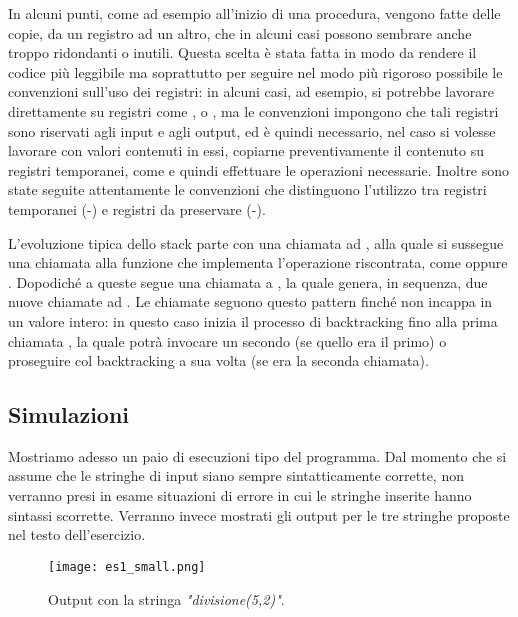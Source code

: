 		In alcuni punti, come ad esempio all'inizio di una procedura, vengono fatte delle copie, da un registro ad un altro, che in alcuni casi possono sembrare anche troppo ridondanti o inutili. Questa scelta è stata fatta in modo da rendere il codice più leggibile ma soprattutto per seguire nel modo più rigoroso possibile le convenzioni sull'uso dei registri: in alcuni casi, ad esempio, si potrebbe lavorare direttamente su registri come ,  o , ma le convenzioni impongono che tali registri sono riservati agli input e agli output, ed è quindi necessario, nel caso si volesse lavorare con valori contenuti in essi, copiarne preventivamente il contenuto su registri temporanei, come  e quindi effettuare le operazioni necessarie. Inoltre sono state seguite attentamente le convenzioni che distinguono l'utilizzo tra registri temporanei (-) e registri da preservare (-).
		
		L'evoluzione tipica dello stack parte con una chiamata ad , alla quale si sussegue una chiamata alla funzione che implementa l'operazione riscontrata, come  oppure . Dopodiché a queste segue una chiamata a , la quale genera, in sequenza, due nuove chiamate ad . Le chiamate seguono questo pattern finché  non incappa in un valore intero: in questo caso inizia il processo di backtracking fino alla prima chiamata , la quale potrà invocare un secondo  (se quello era il primo) o proseguire col backtracking a sua volta (se era la seconda chiamata).
		
	\subsection*{Simulazioni}
		Mostriamo adesso un paio di esecuzioni tipo del programma. Dal momento che si assume che le stringhe di input siano sempre sintatticamente corrette, non verranno presi in esame situazioni di errore in cui le stringhe inserite hanno sintassi scorrette. Verranno invece mostrati gli output per le tre stringhe proposte nel testo dell'esercizio.
		
       	\begin{figure}[h!]
       		\begin{center}
       			\texttt{[image: es1\_small.png]}
       		\end{center}
       		\caption{Output con la stringa \textit{"divisione(5,2)"}.}
       		\label{fig:es1_small}
       	\end{figure}
       	
